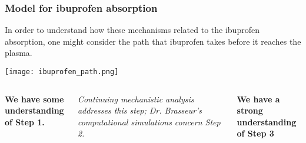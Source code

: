 \documentclass[handout]{beamer}
\begin{document}
\begin{frame}\frametitle{Model for ibuprofen absorption}

	\small

	In order to understand how these mechanisms related to the ibuprofen absorption, one might consider the path that ibuprofen takes before it reaches the plasma.

	\texttt{[image: ibuprofen\_path.png]}

	\pause

	\footnotesize
	\begin{columns}[t]
		\begin{column}{.3\textwidth}
			{\bf We have some understanding of Step 1.}
		\end{column}
		\begin{column}{.3\textwidth}
			{\em Continuing mechanistic analysis addresses this step; Dr. Brasseur's computational simulations concern Step 2.}
		\end{column}
		\begin{column}{.3\textwidth}
			{\bf We have a strong understanding of Step 3}
		\end{column}
	\end{columns}

\end{frame}
\end{document}
